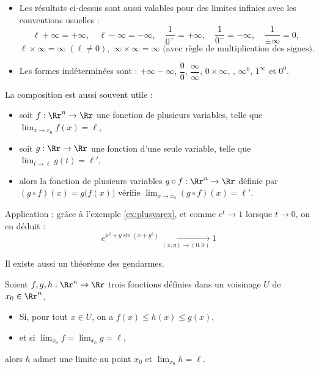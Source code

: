 \documentclass[11pt, class=report,crop=false]{standalone}
\begin{document}
\begin{remarque*}
\sauteligne
\begin{itemize}
  \item 
Les résultats ci-dessus sont aussi valables pour des limites infinies avec les conventions usuelles :
$$\ell+\infty =+\infty,\quad \ell-\infty =-\infty,\quad \frac{1}{0^+}=+\infty ,\quad \frac{1}{0^-}=-\infty ,\quad \frac{1}{\pm \infty }=0,$$
$$\ell\times \infty =\infty \; (\ell\neq 0),\; \infty \times \infty =\infty \text{ (avec règle de multiplication des signes).}$$

  \item 
Les formes indéterminées sont : $+\infty -\infty$, $\dfrac{0}{0}$, 
$\dfrac{\infty }{\infty}$, $0\times \infty$, , $\infty^0$, $1^{\infty}$ et $0^0$.
\end{itemize}
\end{remarque*}


La composition est aussi souvent utile : 
\begin{itemize}
  \item soit $f : \Rr^n \to \Rr$ une fonction de plusieurs variables, telle que $\lim_{x \to x_0} f(x) = \ell$,
  \item soit $g : \Rr \to \Rr$ une fonction d'une seule variable, telle que 
$\lim_{t \to \ell} g(t) = \ell'$,
  \item alors la fonction de plusieurs variables $g \circ f : \Rr^n \to \Rr$ définie par $(g \circ f) (x) = g \big( f(x) \big)$ vérifie
  $\lim_{x \to x_0} (g \circ f)(x) = \ell'$.
\end{itemize}

Application : grâce à l'exemple \ref{ex:plusvarex}, et comme $e^t \to 1$ lorsque $t\to 0$, on en déduit :
$$e^{x^2+y\sin(x+y^2)} \xrightarrow[(x,y) \to (0,0)]{} 1$$


\bigskip

Il existe aussi un théorème \og{}des gendarmes\fg{}.
\begin{theoreme} 
Soient $f,g,h:\Rr^n\to \Rr$ trois fonctions définies dans un voisinage $U$ de $x_0 \in \Rr^n$.
\begin{itemize}
  \item Si, pour tout $x \in U$, on a $f(x) \le  h(x) \le g(x)$,
  \item et si $\lim_{x_0} f = \lim_{x_0} g = \ell$,
\end{itemize}
alors $h$ admet une limite au point $x_0$ et $\displaystyle \lim _{x_0} h=\ell$.
\end{theoreme}
\end{document}
